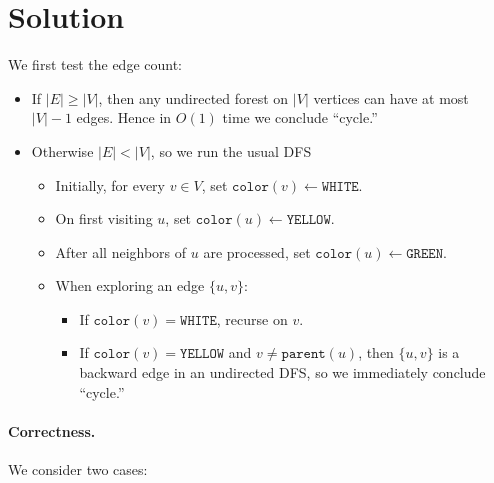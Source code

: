 \documentclass[11pt]{article}
\begin{document}
    \section*{Solution}

    We first test the edge count:
    
    \begin{itemize}
      \item If \(\lvert E\rvert \ge \lvert V\rvert\), then any undirected forest on \(\lvert V\rvert\) vertices can have at most \(\lvert V\rvert-1\) edges.  Hence in \(O(1)\) time we conclude “cycle.”
      \item Otherwise \(\lvert E\rvert<\lvert V\rvert\), so we run the usual DFS
      \begin{itemize}
        \item Initially, for every \(v\in V\), set \(\texttt{color}(v)\gets\texttt{WHITE}\).
        \item On first visiting \(u\), set \(\texttt{color}(u)\gets\texttt{YELLOW}\).
        \item After all neighbors of \(u\) are processed, set \(\texttt{color}(u)\gets\texttt{GREEN}\).
        \item When exploring an edge \(\{u,v\}\):
          \begin{itemize}
            \item If \(\texttt{color}(v)=\texttt{WHITE}\), recurse on \(v\).
            \item If \(\texttt{color}(v)=\texttt{YELLOW}\) and \(v\neq\texttt{parent}(u)\), then \(\{u,v\}\) is a backward edge in an undirected DFS, so we immediately conclude “cycle.”
          \end{itemize}
      \end{itemize}
    \end{itemize}
    
    \paragraph{Correctness.}  
    We consider two cases:
    
\end{document}
